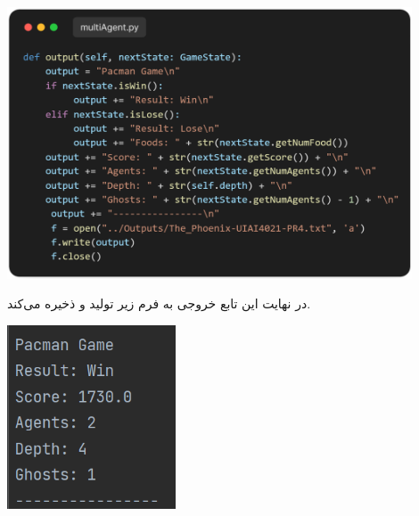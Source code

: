 \documentclass[12pt, dvipsnames, svgnames, x11names,]{article}
\begin{document}
		\begin{center}
			\includegraphics[width=12cm]{images/08}
		\end{center}
	
		{\normalsize در نهایت این تابع خروجی به فرم زیر تولید و ذخیره می‌کند.}
		
		\begin{center}
			\includegraphics[width=5cm]{images/09}
		\end{center}
	
	
	
\end{document}

